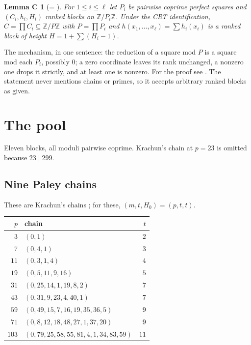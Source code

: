 \documentclass[11pt]{amsart}
\theoremstyle{plain}
\newtheorem*{lemC}{Lemma C}
\theoremstyle{remark}
\newcommand{\Z}{\mathbb{Z}}
\begin{document}
\begin{lemC}[{= \cite[Lemma~5]{Krachun}}]
For $1 \le i \le \ell$ let $P_i$ be pairwise coprime perfect squares and
$(C_i, h_i, H_i)$ ranked blocks on $\Z/P_i\Z$. Under the CRT
identification, $C = \prod C_i \subseteq \Z/P\Z$ with $P = \prod P_i$ and
$h(x_1,\dots,x_\ell) = \sum h_i(x_i)$ is a ranked block of height
$H = 1 + \sum (H_i - 1)$.
\end{lemC}

The mechanism, in one sentence: the reduction of a square mod $P$ is a
square mod each $P_i$, possibly $0$; a zero coordinate leaves its rank
unchanged, a nonzero one drops it strictly, and at least one is nonzero.
For the proof see \cite[Lemma~5]{Krachun}. The statement never mentions
chains or primes, so it accepts arbitrary ranked blocks as given.

\section{The pool}\label{sec:pool}

Eleven blocks, all moduli pairwise coprime. Krachun's chain at $p = 23$ is
omitted because $23 \mid 299$.

\subsection{Nine Paley chains}
These are Krachun's chains \cite{Krachun}; for these,
$(m, t, H_0) = (p, t, t)$.

\begin{center}
\begin{tabular}{rlr}
\toprule
$p$ & chain & $t$ \\
\midrule
$3$   & $(0, 1)$ & $2$ \\
$7$   & $(0, 4, 1)$ & $3$ \\
$11$  & $(0, 3, 1, 4)$ & $4$ \\
$19$  & $(0, 5, 11, 9, 16)$ & $5$ \\
$31$  & $(0, 25, 14, 1, 19, 8, 2)$ & $7$ \\
$43$  & $(0, 31, 9, 23, 4, 40, 1)$ & $7$ \\
$59$  & $(0, 49, 15, 7, 16, 19, 35, 36, 5)$ & $9$ \\
$71$  & $(0, 8, 12, 18, 48, 27, 1, 37, 20)$ & $9$ \\
$103$ & $(0, 79, 25, 58, 55, 81, 4, 1, 34, 83, 59)$ & $11$ \\
\bottomrule
\end{tabular}
\end{center}
\end{document}
